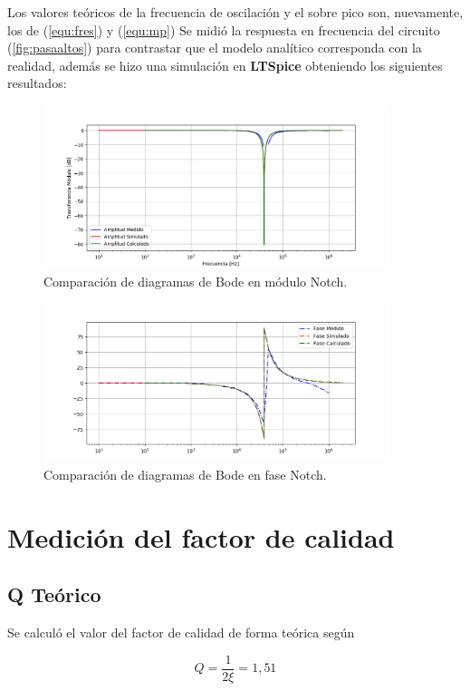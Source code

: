Los valores teóricos de la frecuencia de oscilación y el sobre pico son, nuevamente, los de (\ref{equ:fres}) y (\ref{equ:mp})
Se midió la respuesta en frecuencia del circuito (\ref{fig:pasaaltos}) para contrastar que el modelo analítico corresponda con la realidad, además se hizo una simulación en \textbf{LTSpice} obteniendo los siguientes resultados:
\begin{figure}[H]
	\centering
	\includegraphics[width=0.9\textwidth]{Bodes_Labo/Fotos/BR.png}
\caption{Comparación de diagramas de Bode en módulo Notch.}
	\label{fig:BODEBR}
\end{figure}

\begin{figure}[H]
	\centering
	\includegraphics[width=0.9\textwidth]{Bodes_Labo/Fotos/BRP.png}
\caption{Comparación de diagramas de Bode en fase Notch.}
	\label{fig:BODEBRP}
\end{figure}
\section{Medición del factor de calidad}
\subsection{Q Teórico}
Se calculó el valor del factor de calidad de forma teórica según 

\begin{equation}
    Q=\frac{1}{2\xi}=1,51
\end{equation}


